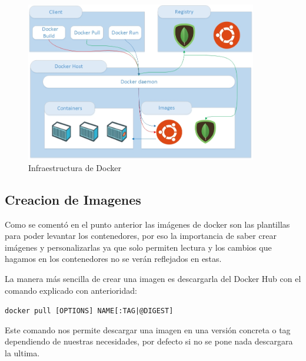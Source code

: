 \begin{figure}[htb]
\begin{center}
\includegraphics[width=0.90\textwidth]{./setup/Infraestructura}
\caption{Infraestructura de Docker}
\label{Inf:Infraestructura}
\end{center}
\end{figure}

\subsection{Creacion de Imagenes}

Como se comentó en el punto anterior las imágenes de docker son las plantillas para poder levantar los contenedores, por eso la importancia de saber crear imágenes y personalizarlas ya que solo permiten lectura y los cambios que hagamos en los contenedores no se verán reflejados en estas.

La manera más sencilla de crear una imagen es descargarla del Docker Hub con el comando explicado con anterioridad:

\begin{center}
\texttt{docker pull [OPTIONS] NAME[:TAG|@DIGEST]}
\end{center}

Este comando nos permite descargar una imagen en una versión concreta o tag dependiendo de nuestras necesidades, por defecto si no se pone nada descargara la ultima. 

